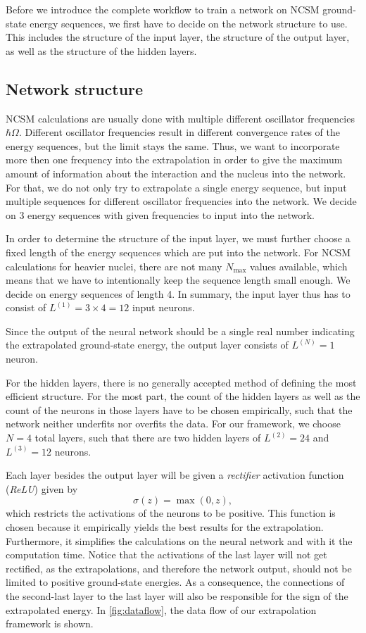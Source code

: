 Before we introduce the complete workflow to train a network on NCSM ground-state energy sequences, we first have to decide on the network structure to use.
This includes the structure of the input layer, the structure of the output layer, as well as the structure of the hidden layers.

\subsection{Network structure}
NCSM calculations are usually done with multiple different oscillator frequencies $\hbar \Omega$. Different oscillator frequencies result in different convergence rates of the energy sequences, but the limit stays the same. Thus, we want to incorporate more then one frequency into the extrapolation in order to give the maximum amount of information about the interaction and the nucleus into the network.
For that, we do not only try to extrapolate a single energy sequence, but input multiple sequences for different oscillator frequencies into the network.
We decide on 3 energy sequences with given frequencies to input into the network.

In order to determine the structure of the input layer, we must further choose a fixed length of the energy sequences which are put into the network.
For NCSM calculations for heavier nuclei, there are not many $N_\mathrm{max}$ values available, which means that we have to intentionally keep the sequence length small enough.
We decide on energy sequences of length 4.
In summary, the input layer thus has to consist of $L^{(1)} = 3\times 4 = 12$ input neurons.

Since the output of the neural network should be a single real number indicating the extrapolated ground-state energy, the output layer consists of $L^{(N)} = 1$ neuron.

For the hidden layers, there is no generally accepted method of defining the most efficient structure. For the most part, the count of the hidden layers as well as the count of the neurons in those layers have to be chosen empirically, such that the network neither underfits nor overfits the data. For our framework, we choose $N = 4$ total layers, such that there are two hidden layers of $L^{(2)} = 24$ and $L^{(3)} = 12$ neurons.

Each layer besides the output layer will be given a \textit{rectifier} activation function (\textit{ReLU}) given by
\begin{equation}
  \sigma(z) = \max(0, z),
\end{equation}
which restricts the activations of the neurons to be positive. This function is chosen because it empirically yields the best results for the extrapolation. Furthermore, it simplifies the calculations on the neural network and with it the computation time. Notice that the activations of the last layer will not get rectified, as the extrapolations, and therefore the network output, should not be limited to positive ground-state energies. As a consequence, the connections of the second-last layer to the last layer will also be responsible for the sign of the extrapolated energy. In \autoref{fig:dataflow}, the data flow of our extrapolation framework is shown.


